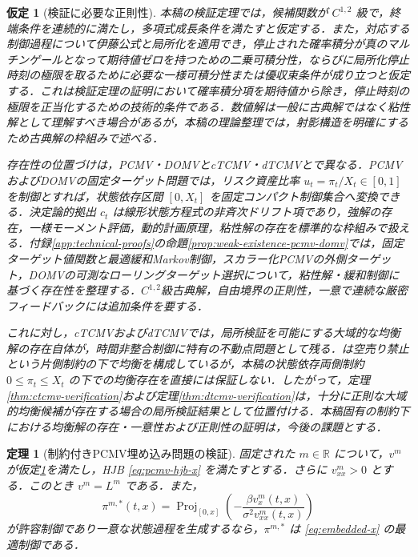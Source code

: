 \documentclass[10pt,a4paper]{article}
\theoremstyle{plain}
\newtheorem{theorem}{定理}
\newtheorem{assumption}{仮定}
\theoremstyle{definition}
\DeclareMathOperator{\Proj}{Proj}
\newcommand{\R}{\mathbb{R}}
\begin{document}
\begin{assumption}[検証に必要な正則性]
\label{ass:verification}
本稿の検証定理では，候補関数が $C^{1,2}$ 級で，終端条件を連続的に満たし，多項式成長条件を満たすと仮定する．また，対応する制御過程について伊藤公式と局所化を適用でき，停止された確率積分が真のマルチンゲールとなって期待値ゼロを持つための二乗可積分性，ならびに局所化停止時刻の極限を取るために必要な一様可積分性または優収束条件が成り立つと仮定する．これは検証定理の証明において確率積分項を期待値から除き，停止時刻の極限を正当化するための技術的条件である．数値解は一般に古典解ではなく粘性解として理解すべき場合があるが，本稿の理論整理では，射影構造を明確にするため古典解の枠組みで述べる．

存在性の位置づけは，PCMV・DOMVとcTCMV・dTCMVとで異なる．PCMVおよびDOMVの固定ターゲット問題では，リスク資産比率 $u_t=\pi_t/X_t\in[0,1]$ を制御とすれば，状態依存区間 $[0,X_t]$ を固定コンパクト制御集合へ変換できる．決定論的拠出 $c_t$ は線形状態方程式の非斉次ドリフト項であり，強解の存在，一様モーメント評価，動的計画原理，粘性解の存在を標準的な枠組みで扱える．付録\ref{app:technical-proofs}の命題\ref{prop:weak-existence-pcmv-domv}では，固定ターゲット値関数と最適緩和Markov制御，スカラー化PCMVの外側ターゲット，DOMVの可測なローリングターゲット選択について，粘性解・緩和制御に基づく存在性を整理する\citep{LiZhouLim2002,LiXu2016,FlemingSoner2006}．$C^{1,2}$級古典解，自由境界の正則性，一意で連続な厳密フィードバックには追加条件を要する．

これに対し，cTCMVおよびdTCMVでは，局所検証を可能にする大域的な均衡解の存在自体が，時間非整合制御に特有の不動点問題として残る．\citet{BensoussanWongYamYung2014}は空売り禁止という片側制約の下で均衡を構成しているが，本稿の状態依存両側制約 $0\leq\pi_t\leq X_t$ の下での均衡存在を直接には保証しない．したがって，定理\ref{thm:ctcmv-verification}および定理\ref{thm:dtcmv-verification}は，十分に正則な大域的均衡候補が存在する場合の局所検証結果として位置付ける．本稿固有の制約下における均衡解の存在・一意性および正則性の証明は，今後の課題とする．
\end{assumption}

\begin{theorem}[制約付きPCMV埋め込み問題の検証]
\label{thm:embedded-pcmv}
固定された $m\in\R$ について，$v^m$ が仮定\ref{ass:verification}を満たし，HJB \eqref{eq:pcmv-hjb-x} を満たすとする．さらに $v_{xx}^m>0$ とする．このとき $v^m=L^m$ である．また，
\begin{equation}
  \pi^{m,*}(t,x)
  =
  \Proj_{[0,x]}
  \left(
  -\frac{\beta v_x^m(t,x)}{\sigma^2v_{xx}^m(t,x)}
  \right)
  \label{eq:pcmv-projection-x}
\end{equation}
が許容制御であり一意な状態過程を生成するなら，$\pi^{m,*}$ は \eqref{eq:embedded-x} の最適制御である．
\end{theorem}
\end{document}
